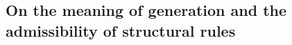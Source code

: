 \documentclass[pra,floatfix,
amsmath,superscriptaddress, 12pt]{article}
\theoremstyle{definition}
\begin{document}








\subsection{On the meaning of generation and the admissibility of structural
rules}

\end{document}
